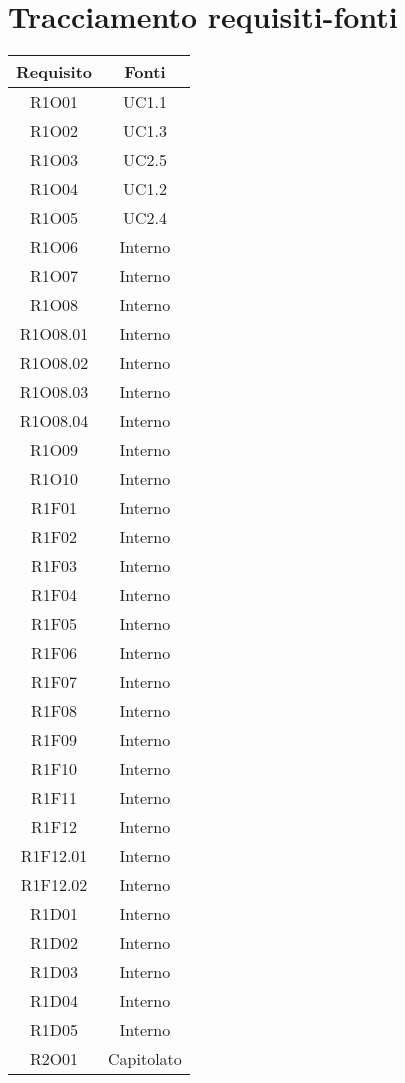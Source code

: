 \section{Tracciamento requisiti-fonti}
\begin{tabularx}{\textwidth}{|C|C|}
	\hline
	\textbf{Requisito} & \textbf{Fonti} \\
	\hline
	\endhead
	R1O01& UC1.1\\
	\hline
	R1O02& UC1.3\\
	\hline
	R1O03& UC2.5\\
	\hline
	R1O04& UC1.2\\
	\hline
	R1O05& UC2.4\\
	\hline
	R1O06& Interno\\
	\hline
	R1O07& Interno\\
	\hline	
	R1O08& Interno\\
	\hline
	R1O08.01& Interno\\
	\hline	
	R1O08.02& Interno\\
	\hline		
	R1O08.03& Interno\\
	\hline		
	R1O08.04& Interno\\
	\hline	
	R1O09& Interno\\
	\hline	
	R1O10& Interno\\
	\hline
	R1F01& Interno\\
	\hline
	R1F02& Interno\\
	\hline
	R1F03& Interno\\
	\hline
	R1F04& Interno\\
	\hline
	R1F05& Interno\\
	\hline
	R1F06& Interno\\
	\hline
	R1F07& Interno\\
	\hline
	R1F08& Interno\\
	\hline
	R1F09& Interno\\
	\hline
	R1F10& Interno\\
	\hline
	R1F11& Interno\\
	\hline
	R1F12& Interno\\
	\hline
	R1F12.01& Interno\\
	\hline
	R1F12.02& Interno\\
	\hline
	R1D01& Interno\\
	\hline
	R1D02& Interno\\
	\hline
	R1D03& Interno\\
	\hline
	R1D04& Interno\\
	\hline
	R1D05& Interno\\
	\hline
	R2O01&Capitolato\\

\end{tabularx}
